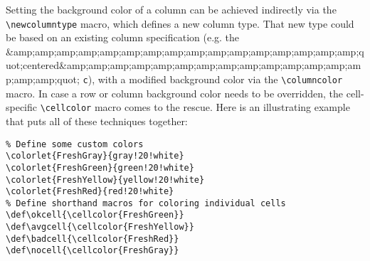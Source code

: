 
Setting the background color of a column can be achieved indirectly via the \verb|\newcolumntype| macro, which defines a new column type. That new type could be based on an existing column specification (e.g. the &amp;amp;amp;amp;amp;amp;amp;amp;amp;amp;amp;amp;amp;amp;amp;amp;quot;centered&amp;amp;amp;amp;amp;amp;amp;amp;amp;amp;amp;amp;amp;amp;amp;amp;quot; \verb|c|), with a modified background color via the \verb|\columncolor| macro. In case a row or column background color needs to be overridden, the cell-specific \verb|\cellcolor| macro comes to the rescue. Here is an illustrating example that puts all of these techniques together:

\begin{lstlisting}
% Define some custom colors
\colorlet{FreshGray}{gray!20!white}
\colorlet{FreshGreen}{green!20!white}
\colorlet{FreshYellow}{yellow!20!white}
\colorlet{FreshRed}{red!20!white}
% Define shorthand macros for coloring individual cells
\def\okcell{\cellcolor{FreshGreen}}
\def\avgcell{\cellcolor{FreshYellow}}
\def\badcell{\cellcolor{FreshRed}}
\def\nocell{\cellcolor{FreshGray}}


\end{lstlisting}
